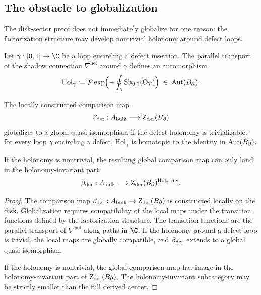 \subsection{The obstacle to globalization}

The disk-sector proof does not immediately globalize for one reason:
the factorization structure may develop nontrivial holonomy around
defect loops.

\begin{definition}
Let $\gamma:[0,1]\to\C$ be a loop encircling a defect insertion.
The parallel transport of the shadow connection
$\nabla^{\mathrm{hol}}$ around $\gamma$ defines an automorphism
\begin{equation}%
\mathrm{Hol}_\gamma
:= \mathcal{P}\exp\Bigl(
-\oint_\gamma\mathrm{Sh}_{0,1}(\Theta_T)
\Bigr)
\;\in\;
\operatorname{Aut}(\Bbound).
\end{equation}
\end{definition}

\begin{proposition}
\label{prop:holonomy-obstruction}
The locally constructed comparison map
\[
\beta_{\mathrm{der}}:A_{\mathrm{bulk}}\longrightarrow\operatorname{Z}_{\mathrm{der}}(B_{\partial})
\]
globalizes to a global quasi-isomorphism if the defect holonomy
is trivializable: for every loop $\gamma$ encircling a defect,
$\mathrm{Hol}_\gamma$ is homotopic to the identity in
$\operatorname{Aut}(B_{\partial})$.

If the holonomy is nontrivial, the resulting global comparison map
can only land in the holonomy-invariant part:
\[
\beta_{\mathrm{der}}:A_{\mathrm{bulk}}
\longrightarrow
\operatorname{Z}_{\mathrm{der}}(B_{\partial})^{\mathrm{Hol}_\gamma\text{-inv}}.
\]
\end{proposition}

\begin{proof}
The comparison map $\beta_{\mathrm{der}}:A_{\mathrm{bulk}}\to\operatorname{Z}_{\mathrm{der}}(B_{\partial})$ is
constructed locally on the disk. Globalization requires
compatibility of the local maps under the transition functions
defined by the factorization structure. The transition functions
are the parallel transport of $\nabla^{\mathrm{hol}}$ along paths
in $\C$. If the holonomy around a defect loop is trivial, the
local maps are globally compatible, and $\beta_{\mathrm{der}}$ extends to
a global quasi-isomorphism.

If the holonomy is nontrivial, the global comparison map has image
in the holonomy-invariant part of $\operatorname{Z}_{\mathrm{der}}(B_{\partial})$. The
holonomy-invariant subcategory may be strictly smaller than the
full derived center.
\end{proof}


